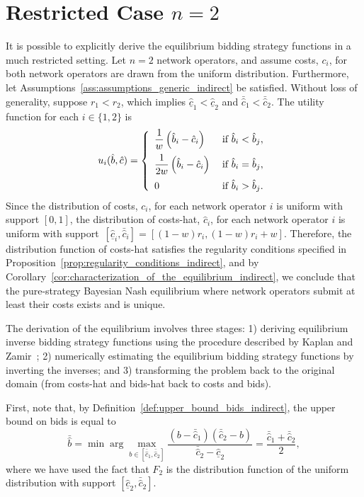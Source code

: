 \section{Restricted Case $n=2$} %
\label{sec:restricted_case_n_2_indirect}
It is possible to explicitly derive the equilibrium bidding strategy functions in a much restricted setting. Let $n=2$ network operators, and assume costs, $c_i$, for both network operators are drawn from the uniform distribution. Furthermore, let Assumptions~\ref{ass:assumptions_generic_indirect} be satisfied. Without loss of generality, suppose $r_1 < r_2$, which implies $\underline{\hat{c}}_1 < \underline{\hat{c}}_2$ and $\bar{\hat{c}}_1 < 
\bar{\hat{c}}_2$. The utility function for each $i\in \{1,2\}$ is
\begin{equation*}
  u_i(\hat{b},\hat{c}) = \left\{
  \begin{array}{l l}
    \displaystyle\frac{1}{w}\left(\hat{b}_i-\hat{c}_i\right) & \;\text{if } \hat{b}_i < \hat{b}_j,\\[2ex]
    \displaystyle\frac{1}{2w}\left(\hat{b}_i-\hat{c}_i\right) & \;\text{if } \hat{b}_i = \hat{b}_j,\\[2ex]
    0 & \;\text{if } \hat{b}_i > \hat{b}_j.
  \end{array}\right.
\end{equation*}
Since the distribution of costs, $c_i$, for each network operator $i$ is uniform with support $[0,1]$, the distribution of costs-hat, $\hat{c}_i$, for each network operator $i$ is uniform with support~${[\underline{\hat{c}}_i, \bar{\hat{c}}_i]} = {[(1-w)r_i, (1-w)r_i + w]}$. Therefore, the distribution function of costs-hat satisfies the regularity conditions specified in Proposition~\ref{prop:regularity_conditions_indirect}, and by Corollary~\ref{cor:characterization_of_the_equilibrium_indirect}, we conclude that the pure-strategy Bayesian Nash equilibrium where network operators submit at least their costs exists and is unique.

The derivation of the equilibrium involves three stages: 1) deriving equilibrium inverse bidding strategy functions using the procedure described by Kaplan and Zamir~\cite{KaplanZamir2007}; 2) numerically estimating the equilibrium bidding strategy functions by inverting the inverses; and 3) transforming the problem back to the original domain (from costs-hat and bids-hat back to costs and bids).

First, note that, by Definition~\ref{def:upper_bound_bids_indirect}, the upper bound on bids is equal to
\begin{equation}
  \label{eq:upper_bound_bids_restricted_indirect}
  \bar{\hat{b}} = \min\arg\max_{b\in[\bar{\hat{c}}_1, \bar{\hat{c}}_2]} \frac{(b - \bar{\hat{c}}_1)(\bar{\hat{c}}_2 - b)}{\bar{\hat{c}}_2 - \underline{\hat{c}}_2} = \frac{\bar{\hat{c}}_1 + \bar{\hat{c}}_2}{2},
\end{equation}
where we have used the fact that $F_2$ is the distribution function of the uniform distribution with support $[\underline{\hat{c}}_2, \bar{\hat{c}}_2]$.

